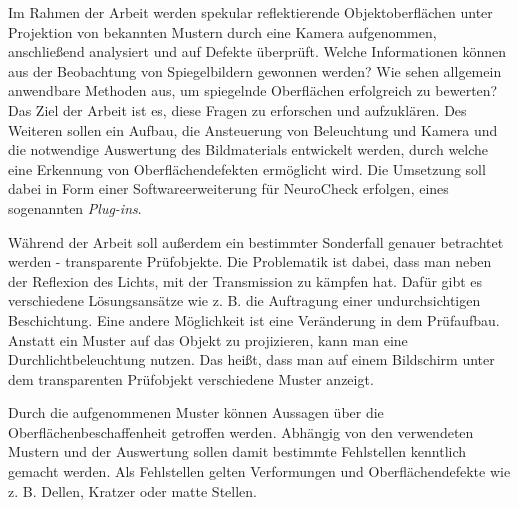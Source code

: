 \p
Im Rahmen der Arbeit werden spekular reflektierende Objektoberflächen unter Projektion von bekannten Mustern durch eine Kamera aufgenommen, anschließend analysiert und auf Defekte überprüft.
Welche Informationen können aus der Beobachtung von Spiegelbildern gewonnen werden?
Wie sehen allgemein anwendbare Methoden aus, um spiegelnde Oberflächen erfolgreich zu bewerten?
Das Ziel der Arbeit ist es, diese Fragen zu erforschen und aufzuklären.
Des Weiteren sollen ein Aufbau, die Ansteuerung von Beleuchtung und Kamera und die notwendige Auswertung des Bildmaterials entwickelt werden, durch welche eine Erkennung von Oberflächendefekten ermöglicht wird.
Die Umsetzung soll dabei in Form einer Softwareerweiterung für NeuroCheck erfolgen, eines sogenannten \textit{Plug-ins}.

\p
Während der Arbeit soll außerdem ein bestimmter Sonderfall genauer betrachtet werden - transparente Prüfobjekte.
Die Problematik ist dabei, dass man neben der Reflexion des Lichts, mit der Transmission zu kämpfen hat.
Dafür gibt es verschiedene Lösungsansätze wie z. B. die Auftragung einer undurchsichtigen Beschichtung.
Eine andere Möglichkeit ist eine Veränderung in dem Prüfaufbau.
Anstatt ein Muster auf das Objekt zu projizieren, kann man eine Durchlichtbeleuchtung nutzen.
Das heißt, dass man auf einem Bildschirm unter dem transparenten Prüfobjekt verschiedene Muster anzeigt.

\p
Durch die aufgenommenen Muster können Aussagen über die Oberflächenbeschaffenheit getroffen werden.
Abhängig von den verwendeten Mustern und der Auswertung sollen damit bestimmte Fehlstellen kenntlich gemacht werden.
Als Fehlstellen gelten Verformungen und Oberflächendefekte wie z. B. Dellen, Kratzer oder matte Stellen.
